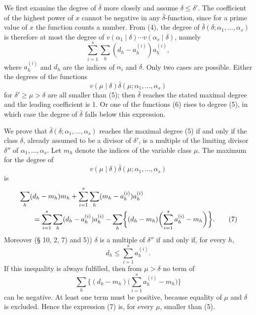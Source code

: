 \documentclass[11pt,a4paper]{article}
\begin{document}
We first examine the degree of $\bar\delta$ more closely and assume $\delta\le\delta'$. The coefficient of the highest power of $x$ cannot be negative in any $\bar\delta$-function, since for a prime value of $x$ the function counts a number. From (4), the degree of $\bar\delta(\delta;\alpha_1,\ldots,
\alpha_s)$ is therefore at most the degree of $v(\alpha_1\mid\delta)\cdots v(\alpha_s\mid\delta)$, namely
\begin{equation}
 \sum_{i=1}^s\sum_h(d_h-a_h^{(i)})a_h^{(i)},
\tag{5}
\end{equation}
where $a_h^{(i)}$ and $d_h$ are the indices of $\alpha_i$ and $\delta$. Only two cases are possible. Either the degrees of the functions
\begin{equation}
 v(\mu\mid\delta)\bar\delta(\mu;\alpha_1,\ldots,\alpha_s)
\tag{6}
\end{equation}
for $\delta'\ge\mu>\delta$ are all smaller than (5); then $\bar\delta$ reaches the stated maximal degree and the leading coefficient is 1. Or one of the functions (6) rises to degree (5), in which case the degree of $\bar\delta$ falls below this expression.

We prove that $\bar\delta(\delta;\alpha_1,\ldots,
\alpha_s)$ reaches the maximal degree (5) if and only if the class $\delta$, already assumed to be a divisor of $\delta'$, is a multiple of the limiting divisor $\delta''$ of $\alpha_1,
\ldots,
\alpha_s$. Let $m_h$ denote the indices of the variable class $\mu$. The maximum for the degree of
\[
 v(\mu\mid\delta)\bar\delta(\mu;\alpha_1,\ldots,\alpha_s)
\]
is
\begin{align}
&\sum_h(d_h-m_h)m_h+\sum_{i=1}^s\sum_h(m_h-a_h^{(i)})a_h^{(i)} \notag\\
&\qquad =\sum_{i=1}^s\sum_h(d_h-a_h^{(i)})a_h^{(i)}
 -\sum_h\biggl\{(d_h-m_h)\biggl(\sum_{i=1}^s a_h^{(i)}-m_h\biggr)\biggr\}.
\tag{7}
\end{align}
Moreover (§ 10, 2, 7) and 5)) $\delta$ is a multiple of $\delta''$ if and only if, for every $h$,
\begin{equation}
 d_h\le\sum_{i=1}^s a_h^{(i)}.
\tag{8}
\end{equation}
If this inequality is always fulfilled, then from $\mu>\delta$ no term of
\begin{equation}
 \sum_h\biggl\{(d_h-m_h)\biggl(\sum_{i=1}^s a_h^{(i)}-m_h\biggr)\biggr\}
\tag{9}
\end{equation}
can be negative. At least one term must be positive, because equality of $\mu$ and $\delta$ is excluded. Hence the expression (7) is, for every $\mu$, smaller than (5).
\end{document}
